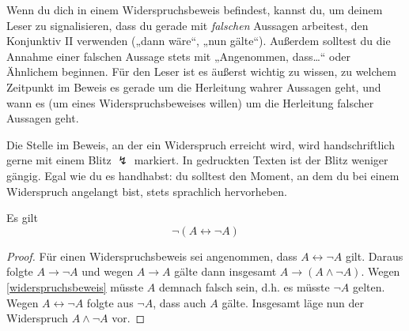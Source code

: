   

  
\begin{bem}
    Wenn du dich in einem Widerspruchsbeweis befindest, kannst du, um deinem Leser zu signalisieren, dass du gerade mit \emph{falschen} Aussagen arbeitest, den Konjunktiv II verwenden („dann wäre“, „nun gälte“). Außerdem solltest du die Annahme einer falschen Aussage stets mit „Angenommen, dass\dots“ oder Ähnlichem beginnen. Für den Leser ist es äußerst wichtig zu wissen, zu welchem Zeitpunkt im Beweis es gerade um die Herleitung wahrer Aussagen geht, und wann es (um eines Widerspruchsbeweises willen) um die Herleitung falscher Aussagen geht.
    
    Die Stelle im Beweis, an der ein Widerspruch erreicht wird, wird handschriftlich gerne mit einem Blitz $\lightning$ markiert. In gedruckten Texten ist der Blitz weniger gängig. Egal wie du es handhabst: du solltest den Moment, an dem du bei einem Widerspruch angelangt bist, stets sprachlich hervorheben.
\end{bem}


\begin{satz}[*] \label{paradox}
    Es gilt
        \[ \neg (A\leftrightarrow \neg A) \]
\end{satz}
\begin{proof}
    Für einen Widerspruchsbeweis sei angenommen, dass $A\leftrightarrow \neg A$ gilt. Daraus folgte $A\to \neg A$ und wegen $A\to A$ gälte dann insgesamt $A\to (A\land \neg A)$. Wegen \cref{widerspruchsbeweis} müsste $A$ demnach falsch sein, d.h. es müsste $\neg A$ gelten. Wegen $A\leftrightarrow \neg A$ folgte aus $\neg A$, dass auch $A$ gälte. Insgesamt läge nun der Widerspruch $A\land \neg A$ vor.
\end{proof}



